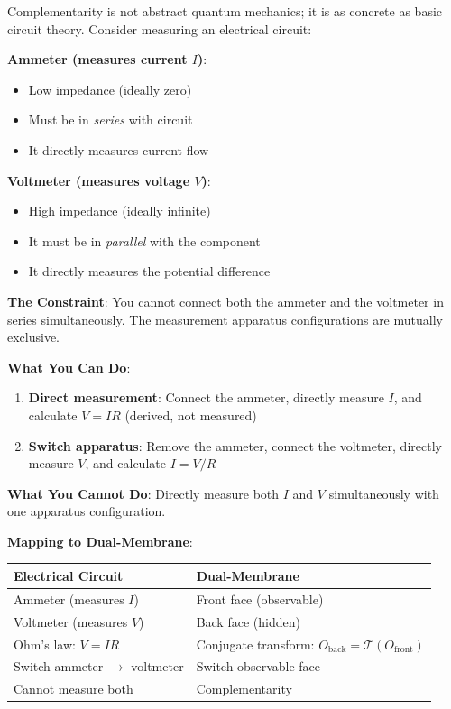 \documentclass[twocolumn,10pt,a4paper]{article}
\theoremstyle{definition}
\theoremstyle{remark}
\begin{document}
Complementarity is not abstract quantum mechanics; it is as concrete as basic circuit theory. Consider measuring an electrical circuit:

\textbf{Ammeter (measures current $I$)}:
\begin{itemize}
\item Low impedance (ideally zero)
\item Must be in \emph{series} with circuit
\item It directly measures current flow
\end{itemize}

\textbf{Voltmeter (measures voltage $V$)}:
\begin{itemize}
\item High impedance (ideally infinite)
\item It must be in \emph{parallel} with the component
\item It directly measures the potential difference
\end{itemize}

\textbf{The Constraint}: You cannot connect both the ammeter and the voltmeter in series simultaneously. The measurement apparatus configurations are mutually exclusive.

\textbf{What You Can Do}:
\begin{enumerate}
\item \textbf{Direct measurement}: Connect the ammeter, directly measure $I$, and calculate $V = IR$ (derived, not measured)
\item \textbf{Switch apparatus}: Remove the ammeter, connect the voltmeter, directly measure $V$, and calculate $I = V/R$
\end{enumerate}

\textbf{What You Cannot Do}: Directly measure both $I$ and $V$ simultaneously with one apparatus configuration.

\textbf{Mapping to Dual-Membrane}:
\begin{center}
\begin{tabular}{ll}
\toprule
Electrical Circuit & Dual-Membrane \\
\midrule
Ammeter (measures $I$) & Front face (observable) \\
Voltmeter (measures $V$) & Back face (hidden) \\
Ohm's law: $V = IR$ & Conjugate transform: $O_{\text{back}} = \mathcal{T}(O_{\text{front}})$ \\
Switch ammeter $\to$ voltmeter & Switch observable face \\
Cannot measure both & Complementarity \\
\bottomrule
\end{tabular}
\end{center}
\end{document}
